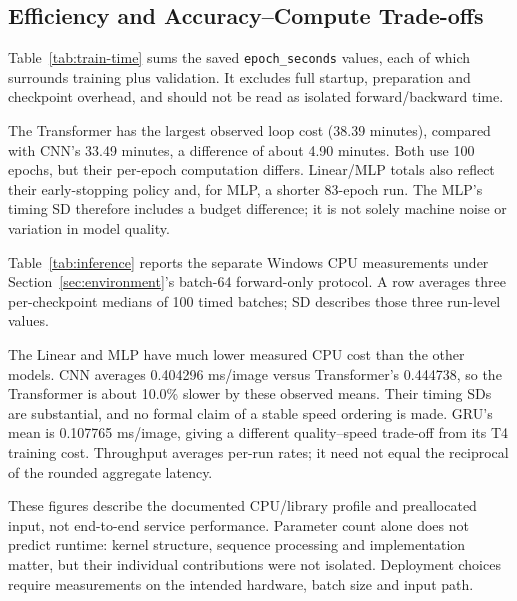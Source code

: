 \subsection{Efficiency and Accuracy--Compute Trade-offs}
Table~\ref{tab:train-time} sums the saved \texttt{epoch\_seconds} values, each
of which surrounds training plus validation. It excludes full startup,
preparation and checkpoint overhead, and should not be read as isolated
forward/backward time.
\begin{table}[H]\centering\small
\caption{T4 train-and-validation epoch-loop cost. Epoch sequences and best
epochs are ordered by seeds 69420/67/69; times are mean \(\pm\) sample SD.}
\label{tab:train-time}

\end{table}
The Transformer has the largest observed loop cost (38.39 minutes), compared
with CNN's 33.49 minutes, a difference of about 4.90 minutes. Both use 100
epochs, but their per-epoch computation differs. Linear/MLP totals also reflect
their early-stopping policy and, for MLP, a shorter 83-epoch run. The MLP's
timing SD therefore includes a budget difference; it is not solely machine noise
or variation in model quality.

Table~\ref{tab:inference} reports the separate Windows CPU measurements under
Section~\ref{sec:environment}'s batch-64 forward-only protocol. A row averages
three per-checkpoint medians of 100 timed batches; SD describes those three
run-level values.
\begin{table}[H]\centering\small
\caption{Windows CPU forward-only timing: two threads, float32, batch 64,
20 warm-ups and 100 timed batches per checkpoint; \(n=3\).}
\label{tab:inference}

\end{table}
The Linear and MLP have much lower measured CPU cost than the other models.
CNN averages 0.404296 ms/image versus Transformer's 0.444738, so the Transformer
is about 10.0\% slower by these observed means. Their timing SDs are substantial,
and no formal claim of a stable speed ordering is made. GRU's mean is 0.107765
ms/image, giving a different quality--speed trade-off from its T4 training cost.
Throughput averages per-run rates; it need not equal the reciprocal of the rounded
aggregate latency.

These figures describe the documented CPU/library profile and preallocated input,
not end-to-end service performance. Parameter count alone does not predict runtime:
kernel structure, sequence processing and implementation matter, but their
individual contributions were not isolated. Deployment choices require measurements
on the intended hardware, batch size and input path.
\FloatBarrier

